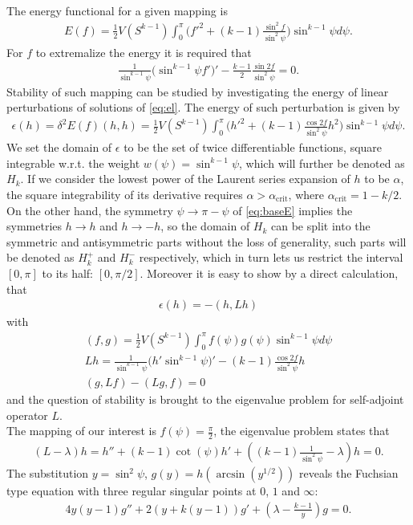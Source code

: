 \documentclass[
a4paper,%
10pt,%
titlepage,%
twoside%
]{article}
\begin{document}
The energy functional for a given mapping is
\begin{gather}\label{eq:baseE}
  E(f)=\frac{1}{2}V(S^{k-1})\int_0^{\pi}\bigg(f'^2+(k-1)\frac{\sin^2f}{\sin^2\psi}\bigg)\sin^{k-1}\psi d\psi.
\end{gather}
For $f$ to extremalize the energy it is required that
\begin{gather}\label{eq:el}
  \frac{1}{\sin^{k-1}\psi}\big(\sin^{k-1}\psi f'\big)'-\frac{k-1}{2}\frac{\sin 2 f}{\sin^2\psi}=0.
\end{gather}
Stability of such mapping can be studied by investigating the energy
of linear perturbations of solutions of \eqref{eq:el}. The energy of
such perturbation is given by
\begin{gather}\label{eq:infE}
  \epsilon(h)=\delta^2E(f)(h,h)=\frac{1}{2}V(S^{k-1})\int_0^{\pi}\bigg(h'^2+(k-1)\frac{\cos 2f}{\sin^2\psi }h^2\bigg)\sin^{k-1}\psi d\psi.
\end{gather}
We set the domain of $\epsilon$ to be the set of twice differentiable
functions, square integrable w.r.t. the weight
$w(\psi)=\sin^{k-1}\psi$, which will further be denoted as $H_k$. If
we consider the lowest power of the Laurent series expansion of $h$ to
be $\alpha$, the square integrability of its derivative requires
$\alpha>\alpha_{\text{crit}}$, where $\alpha_{\text{crit}}=1-k/2$. On
the other hand, the symmetry $\psi\rightarrow\pi-\psi$ of
\eqref{eq:baseE} implies the symmetries $h\rightarrow h$ and
$h\rightarrow-h$, so the domain of $H_k$ can be split into the
symmetric and antisymmetric parts without the loss of generality, such
parts will be denoted as $H^+_k$ and $H^-_k$ respectively, which in
turn lets us restrict the interval $[0,\pi]$ to its half:
$[0,\pi/2]$. Moreover it is easy to show by a direct calculation, that
\begin{gather}
  \epsilon(h)=-(h,Lh)
\end{gather}
with
\begin{gather}
  (f,g)=\frac{1}{2}V(S^{k-1})\int_0^\pi f(\psi) g(\psi) \sin^{k-1}\psi d\psi\\
  Lh=\frac{1}{\sin^{k-1}\psi}\big(h'\sin^{k-1}\psi\big)'-(k-1)\frac{\cos 2 f}{\sin^2\psi}h\\
  (g,Lf)-(Lg,f)=0
\end{gather}
and the question of stability is brought to the eigenvalue problem for
self-adjoint operator $L$.\\

The mapping of our interest is $f(\psi)=\frac{\pi}{2}$, the eigenvalue
problem states that
\begin{gather}\label{eq:problem}
  (L-\lambda)h=h''+(k-1)\cot(\psi)h'+((k-1)\frac{1}{\sin^2\psi}-\lambda)h=0.
\end{gather}
The substitution $y=\sin^2\psi$, $g(y)=h(\arcsin(y^{1/2}))$ reveals
the Fuchsian type equation with three regular singular points at $0$,
$1$ and $\infty$:
\begin{gather}
  4y(y-1)g''+2(y+k(y-1))g'+(\lambda-\frac{k-1}{y})g=0.
\end{gather}
\end{document}
